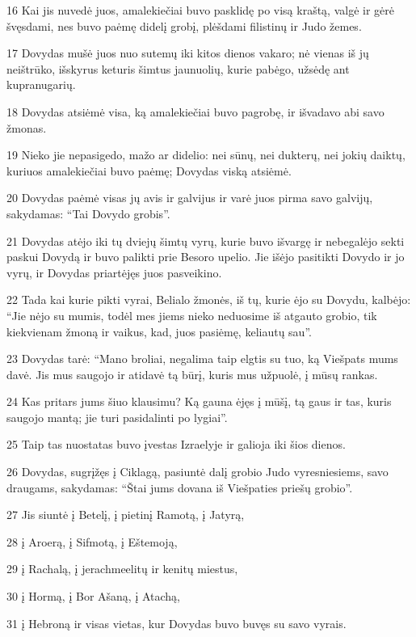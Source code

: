 \par 16 Kai jis nuvedė juos, amalekiečiai buvo pasklidę po visą kraštą, valgė ir gėrė švęsdami, nes buvo paėmę didelį grobį, plėšdami filistinų ir Judo žemes. 
\par 17 Dovydas mušė juos nuo sutemų iki kitos dienos vakaro; nė vienas iš jų neištrūko, išskyrus keturis šimtus jaunuolių, kurie pabėgo, užsėdę ant kupranugarių. 
\par 18 Dovydas atsiėmė visa, ką amalekiečiai buvo pagrobę, ir išvadavo abi savo žmonas. 
\par 19 Nieko jie nepasigedo, mažo ar didelio: nei sūnų, nei dukterų, nei jokių daiktų, kuriuos amalekiečiai buvo paėmę; Dovydas viską atsiėmė. 
\par 20 Dovydas paėmė visas jų avis ir galvijus ir varė juos pirma savo galvijų, sakydamas: “Tai Dovydo grobis”. 
\par 21 Dovydas atėjo iki tų dviejų šimtų vyrų, kurie buvo išvargę ir nebegalėjo sekti paskui Dovydą ir buvo palikti prie Besoro upelio. Jie išėjo pasitikti Dovydo ir jo vyrų, ir Dovydas priartėjęs juos pasveikino. 
\par 22 Tada kai kurie pikti vyrai, Belialo žmonės, iš tų, kurie ėjo su Dovydu, kalbėjo: “Jie nėjo su mumis, todėl mes jiems nieko neduosime iš atgauto grobio, tik kiekvienam žmoną ir vaikus, kad, juos pasiėmę, keliautų sau”. 
\par 23 Dovydas tarė: “Mano broliai, negalima taip elgtis su tuo, ką Viešpats mums davė. Jis mus saugojo ir atidavė tą būrį, kuris mus užpuolė, į mūsų rankas. 
\par 24 Kas pritars jums šiuo klausimu? Ką gauna ėjęs į mūšį, tą gaus ir tas, kuris saugojo mantą; jie turi pasidalinti po lygiai”. 
\par 25 Taip tas nuostatas buvo įvestas Izraelyje ir galioja iki šios dienos. 
\par 26 Dovydas, sugrįžęs į Ciklagą, pasiuntė dalį grobio Judo vyresniesiems, savo draugams, sakydamas: “Štai jums dovana iš Viešpaties priešų grobio”. 
\par 27 Jis siuntė į Betelį, į pietinį Ramotą, į Jatyrą, 
\par 28 į Aroerą, į Sifmotą, į Eštemoją, 
\par 29 į Rachalą, į jerachmeelitų ir kenitų miestus, 
\par 30 į Hormą, į Bor Ašaną, į Atachą, 
\par 31 į Hebroną ir visas vietas, kur Dovydas buvo buvęs su savo vyrais.



